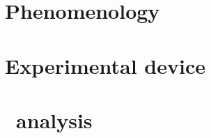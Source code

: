 \subsection*{}
\section{Phenomenology}


\subsection*{}
\section{Experimental device}


\subsection*{}
\section{\HAtoTauTau\ analysis}


\subsection*{}
